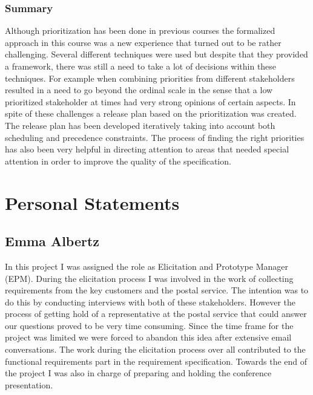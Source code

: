 \documentclass[10pt,a4paper]{article}
\begin{document}
\subsubsection*{Summary} Although prioritization has been done in previous courses the formalized approach in this course was  a new experience that turned out to be rather challenging. Several different techniques were used but despite that they provided a framework, there was still a need to take a lot of decisions within these techniques. For example when combining priorities from different stakeholders resulted in a need to go beyond the ordinal scale in the sense that a low prioritized stakeholder at times had very strong opinions of certain aspects. In spite of these challenges a release plan based on the prioritization was created. The release plan has been developed iteratively taking into account both scheduling and precedence constraints. The process of finding the right priorities has also been very helpful in directing attention to areas that needed special attention in order to improve the quality of the specification. 


\section{Personal Statements}

\subsection{Emma Albertz}
In this project I was assigned the role as Elicitation and Prototype Manager (EPM). During the elicitation process I was involved in the work of collecting requirements from the key customers and the postal service. The intention was to do this by conducting interviews with both of these stakeholders. However the process of getting hold of a representative at the postal service that could answer our questions proved to be very time consuming. Since the time frame for the project was limited we were forced to abandon this idea after extensive email conversations. The work during the elicitation process over all contributed to the functional requirements part in the requirement specification. Towards the end of the project I was also in charge of preparing and holding the conference presentation. 
\end{document}
